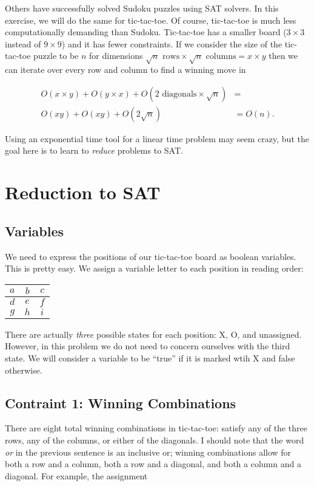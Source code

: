 \documentclass[12pt]{article}
\newcommand{\tictactoe}[9]{\begin{center}\begin{tabular}{ c | c | c }{$#1$} & {$#2$} & {$#3$} \\ \hline {$#4$} & {$#5$} & {$#6$} \\ \hline {$#7$} & {$#8$} & {$#9$} \end{tabular}\end{center}}
\begin{document}
Others have successfully solved Sudoku puzzles using SAT solvers.
In this exercise, we will do the same for tic-tac-toe.
Of course, tic-tac-toe is much less computationally demanding than Sudoku.
Tic-tac-toe has a smaller board ($3 \times 3$ instead of $9 \times 9$) and it has fewer constraints.
If we consider the size of the tic-tac-toe puzzle to be $n$ for dimensions $\sqrt{n} \textrm{ rows} \times \sqrt{n} \textrm{ columns} = x \times y$ then we can iterate over every row and column to find a winning move in

\begin{align}O(x \times y) + O(y \times x ) + O(2 \textrm{ diagonals} \times \sqrt{n}) &= \\
O(xy)+O(xy)+O(2\sqrt{n})
&=O(n).
\end{align}

Using an exponential time tool for a linear time problem may seem crazy, but the goal here is to learn to \textit{reduce} problems to SAT.

\section{Reduction to SAT}

\subsection{Variables}

We need to express the positions of our tic-tac-toe board as boolean variables. This is pretty easy. We assign a variable letter to each position in reading order:

\tictactoe{a}{b}{c}{d}{e}{f}{g}{h}{i}

There are actually \textit{three} possible states for each position: X, O, and unassigned. However, in this problem we do not need to concern ourselves with the third state.
We will consider a variable to be ``true'' if it is marked wtih X and false otherwise.

\subsection{Contraint 1: Winning Combinations}

There are eight total winning combinations in tic-tac-toe: satisfy any of the three rows, any of the columns, or either of the diagonals.
I should note that the word \textit{or} in the previous sentence is an inclusive or; winning combinations allow for both a row and a column, both a row and a diagonal, and both a column and a diagonal. For example, the assignment
\end{document}
